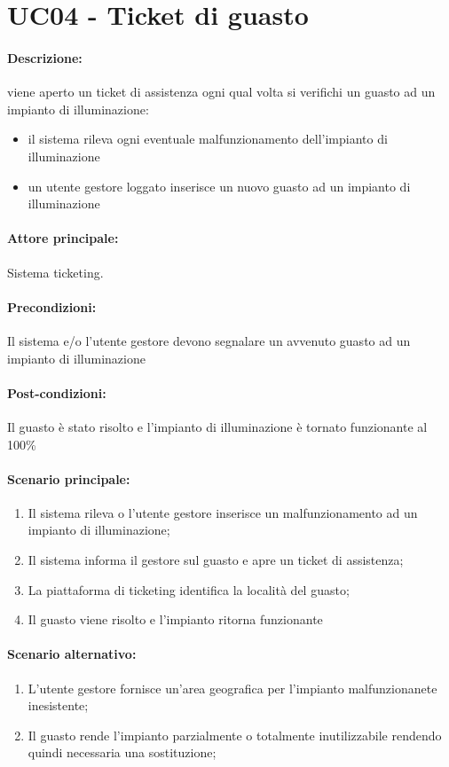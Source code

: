 \section{UC04 - Ticket di guasto}

\paragraph{Descrizione:} viene aperto un ticket di assistenza ogni qual volta si verifichi un guasto ad un impianto di illuminazione:
\begin{itemize}
    \item il sistema rileva ogni
    eventuale malfunzionamento dell’impianto di illuminazione
    \item un utente gestore loggato inserisce un nuovo guasto ad un impianto di illuminazione
\end{itemize}


\paragraph{Attore principale:}
Sistema ticketing.

\paragraph{Precondizioni:}
Il sistema e/o l'utente gestore devono segnalare un avvenuto guasto ad un impianto di illuminazione

\paragraph{Post-condizioni:}
Il guasto è stato risolto e l'impianto di illuminazione è tornato funzionante al 100\%

\paragraph{Scenario principale:}
\begin{enumerate}
    \item Il sistema rileva o l'utente gestore inserisce un malfunzionamento ad un impianto di illuminazione;
    \item Il sistema informa il gestore sul guasto e apre un ticket di assistenza;
    \item La piattaforma di ticketing identifica la località del guasto;
    \item Il guasto viene risolto e l'impianto ritorna funzionante
\end{enumerate}

\paragraph{Scenario alternativo:}
\begin{enumerate}
    \item L'utente gestore fornisce un'area geografica per l'impianto malfunzionanete inesistente;
    \item Il guasto rende l'impianto parzialmente o totalmente inutilizzabile rendendo quindi necessaria una sostituzione;
\end{enumerate}

